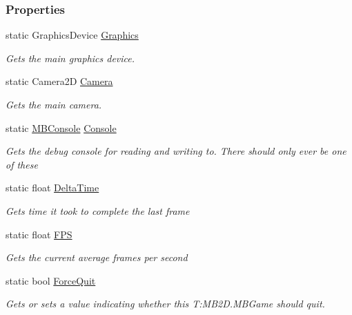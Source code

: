 \subsubsection*{Properties}
\begin{DoxyCompactItemize}
\item 
static Graphics\+Device \hyperlink{class_m_b2_d_1_1_m_b_game_ab46479cca47c2d5da6528ef81e9ff7c1}{Graphics}
\begin{DoxyCompactList}\small\item\em Gets the main graphics device. \end{DoxyCompactList}\item 
static Camera2D \hyperlink{class_m_b2_d_1_1_m_b_game_adec48f512c50332353b12a569630defe}{Camera}
\begin{DoxyCompactList}\small\item\em Gets the main camera. \end{DoxyCompactList}\item 
static \hyperlink{class_m_b2_d_1_1_m_b_console}{M\+B\+Console} \hyperlink{class_m_b2_d_1_1_m_b_game_a0db7935dd8a9f15b2dce1031920a4127}{Console}
\begin{DoxyCompactList}\small\item\em Gets the debug console for reading and writing to. There should only ever be one of these \end{DoxyCompactList}\item 
static float \hyperlink{class_m_b2_d_1_1_m_b_game_ad5f17615f6a86c891635491cba99337d}{Delta\+Time}
\begin{DoxyCompactList}\small\item\em Gets time it took to complete the last frame \end{DoxyCompactList}\item 
static float \hyperlink{class_m_b2_d_1_1_m_b_game_acb9e6dfedc44ee2df89aa9714f098faf}{F\+PS}
\begin{DoxyCompactList}\small\item\em Gets the current average frames per second \end{DoxyCompactList}\item 
static bool \hyperlink{class_m_b2_d_1_1_m_b_game_a74cd19bc8809a473a639aed105f0f4e9}{Force\+Quit}
\begin{DoxyCompactList}\small\item\em Gets or sets a value indicating whether this T\+:\+M\+B2\+D.\+M\+B\+Game should quit. \end{DoxyCompactList}\end{DoxyCompactItemize}



